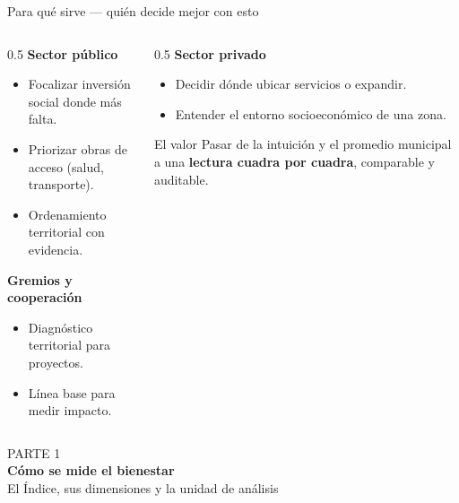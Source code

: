\documentclass[aspectratio=169,11pt]{beamer}
\begin{document}
\begin{frame}{Para qué sirve — quién decide mejor con esto}
\begin{columns}[T]
\begin{column}{0.5\textwidth}
\textbf{\color{tAccent}Sector público}
\begin{itemize}\footnotesize
  \item Focalizar inversión social donde más falta.
  \item Priorizar obras de acceso (salud, transporte).
  \item Ordenamiento territorial con evidencia.
\end{itemize}
\medskip
\textbf{\color{tAccent}Gremios y cooperación}
\begin{itemize}\footnotesize
  \item Diagnóstico territorial para proyectos.
  \item Línea base para medir impacto.
\end{itemize}
\end{column}
\begin{column}{0.5\textwidth}
\textbf{\color{tAccent}Sector privado}
\begin{itemize}\footnotesize
  \item Decidir dónde ubicar servicios o expandir.
  \item Entender el entorno socioeconómico de una zona.
\end{itemize}
\medskip
\begin{block}{El valor}
Pasar de la intuición y el promedio municipal a una \textbf{lectura cuadra por cuadra}, comparable y auditable.
\end{block}
\end{column}
\end{columns}
\end{frame}

\begin{frame}[plain]
\vfill
\centering
{\color{white}\ttfamily\small PARTE 1}\\[0.4em]
{\color{white}\Huge\bfseries Cómo se mide el bienestar}\\[0.4em]
{\color{tAccentL}\large El Índice, sus dimensiones y la unidad de análisis}
\vfill
\end{frame}
\end{document}
